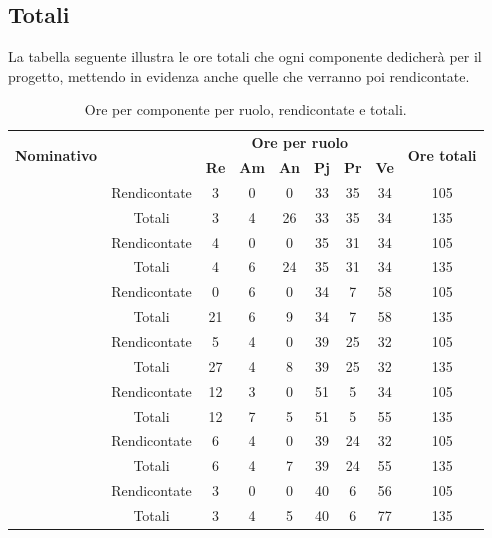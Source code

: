 \subsection{Totali}
La tabella seguente illustra le ore totali che ogni componente dedicherà per il progetto, mettendo in evidenza anche quelle che verranno poi rendicontate.
\begin{table}[H]
	\begin{center}
		\begin{tabular}{|c|c|c|c|c|c|c|c|c|}
			\hline
			\multirow{2}{*}{\textbf{Nominativo}} & & \multicolumn{6}{c|}{\textbf{Ore per ruolo}} & \multirow{2}{*}{\textbf{Ore totali}} \\
			& & \textbf{Re} & \textbf{Am} & \textbf{An} & \textbf{Pj} & \textbf{Pr} & \textbf{Ve} & \\
			\hline
			\hline
			\multirow{2}{*}{\FB}		&	Rendicontate	&	3	&	0	&	0	&	33	&	35	& 34 	&	105	\\
			\cline{2-9}
			&	Totali			&	3	&	4	&	26	&	33	&	35	& 	34	&	135	\\
			\hline	
			\hline
			\multirow{2}{*}{\AF}	&	Rendicontate	&	4	&	0	&	0	&	35	&	31	&  34	&	105	\\
			\cline{2-9}
			&	Totali			&	4	&	6	&	24	&	35	&	31	& 	34	&	135	\\
			\hline
			\hline
			\multirow{2}{*}{\GN}	&	Rendicontate	&	0	&	6	&	0	&	34	&	7	&	58	&	105	\\
			\cline{2-9}
			&	Totali			&	21	&	6	&	9	&	34	&	7	&	58	&	135	\\
			\hline
			\hline					
			\multirow{2}{*}{\GR}	&	Rendicontate	&	5	&	4	&	0	&	39	&	25	&	32	&	105	\\
			\cline{2-9}
			&	Totali			&	27	&	4	&	8	&	39	&	25	&	32	&	135	\\
			\hline
			\hline
			\multirow{2}{*}{\SM}		&	Rendicontate	&	12	&	3	&	0	&	51	&	5	& 	34	&	105	\\
			\cline{2-9}
			&	Totali			&	12	&	7	&	5	&	51	&	5	& 	55	&	135	\\
			\hline			
			\hline
			\multirow{2}{*}{\MP}	&	Rendicontate	&	6	&	4	&	0	&	39	&	24	& 	32	&	105	\\
			\cline{2-9}
			&	Totali			&	6	&	4	&	7	&	39	&	24	& 	55	&	135	\\
			\hline
			\hline			
			\multirow{2}{*}{\MV}	&	Rendicontate	&	3	&	0	&	0	&	40	&	6	& 	56	&	105	\\
			\cline{2-9}
			&	Totali			&	3	&	4	&	5	&	40	&	6	& 	77	&	135	\\
			\hline
		\end{tabular}
	\end{center}
	\caption{Ore per componente per ruolo, rendicontate e totali.}
\end{table}
